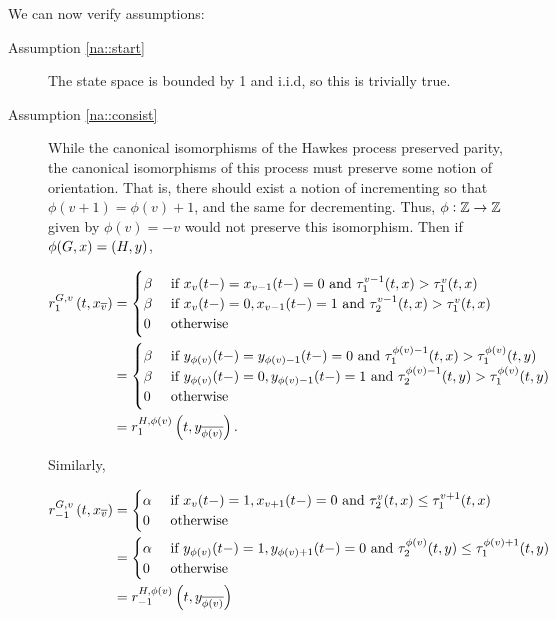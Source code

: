 \ind We can now verify assumptions:

\begin{description}
\item[Assumption \ref{na::start}]

The state space is bounded by 1 and i.i.d, so this is trivially true.

\item[Assumption \ref{na::consist}]

While the canonical isomorphisms of the Hawkes process preserved parity, the canonical isomorphisms of this process must preserve some notion of orientation. That is, there should exist a notion of incrementing so that \(\phi(v+1) = \phi(v)+1\), and the same for decrementing. Thus, \(\phi:\mathbb{Z} \rightarrow \mathbb{Z}\) given by \(\phi(v) = -v\) would not preserve this isomorphism. Then if \(\phi(G,x) = (H,y)\),

\begin{align*}
\rate\gvpara{G}{v}\stpara{1}\tmepro{t}{\xf\vind{\cl{v}}}{} &= \begin{cases}
\beta &\te{ if } \xf\vind{v}\tme{t-} = \xf\vind{v-1}\tme{t-} = 0\te{ and } \tau^{v-1}_1(t,\xf) > \tau^v_1(t,\xf)\\
\beta &\te{ if } \xf\vind{v}\tme{t-} = 0,\xf\vind{v-1}\tme{t-} = 1\te{ and } \tau^{v-1}_2(t,\xf) > \tau^v_1(t,\xf)\\
0&\te{ otherwise}
\end{cases}\\
&=\begin{cases}
\beta &\te{ if } \xg\vind{\phi(v)}\tme{t-} = \xg\vind{\phi(v)-1}\tme{t-} = 0\te{ and } \tau^{\phi(v)-1}_1(t,\xf) > \tau^{\phi(v)}_1(t,\xg)\\
\beta &\te{ if } \xg\vind{\phi(v)}\tme{t-} = 0,\xg\vind{\phi(v)-1}\tme{t-} = 1\te{ and } \tau^{\phi(v)-1}_2(t,\xg) > \tau^{\phi(v)}_1(t,\xg)\\
0&\te{ otherwise}
\end{cases}\\
&= \rate\gvpara{H}{\phi(v)}\stpara{1}\tmepro{t}{\xg\vind{\cl{\phi(v)}}}{}.
\end{align*}

Similarly,

\begin{align*}
\rate\gvpara{G}{v}\stpara{-1}\tmepro{t}{\xf_{\cl{v}}}{} &=  \begin{cases}
\alpha &\te{ if } \xf\vind{v}\tme{t-} = 1, \xf\vind{v+1}\tme{t-} = 0\te{ and } \tau^{v}_2(t,\xf) \leq \tau^{v+1}_1(t,\xf)\\
0&\te{ otherwise}
\end{cases}\\
&=\begin{cases}
\alpha &\te{ if } \xg\vind{\phi(v)}\tme{t-} = 1, \xg\vind{\phi(v)+1}\tme{t-} = 0\te{ and } \tau^{\phi(v)}_2(t,\xg) \leq \tau^{\phi(v)+1}_1(t,\xg)\\
0&\te{ otherwise}
\end{cases}\\
&=\rate\gvpara{H}{\phi(v)}\stpara{-1}\tmepro{t}{\xg_{\cl{\phi(v)}}}{}
\end{align*}


\end{description}
